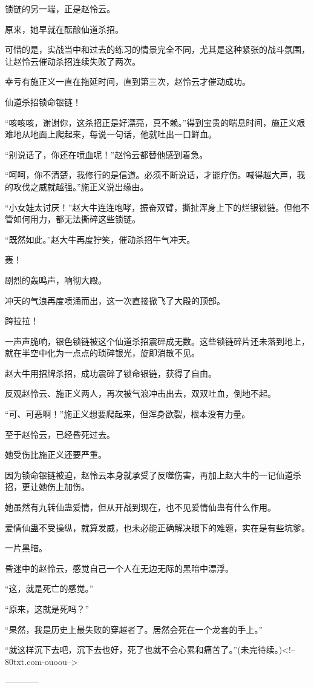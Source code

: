 \begin{this_body}
锁链的另一端，正是赵怜云。

原来，她早就在酝酿仙道杀招。

可惜的是，实战当中和过去的练习的情景完全不同，尤其是这种紧张的战斗氛围，让赵怜云催动杀招连续失败了两次。

幸亏有施正义一直在拖延时间，直到第三次，赵怜云才催动成功。

仙道杀招锁命银链！

“咳咳咳，谢谢你，这杀招正是好漂亮，真不赖。”得到宝贵的喘息时间，施正义艰难地从地面上爬起来，每说一句话，他就吐出一口鲜血。

“别说话了，你还在喷血呢！”赵怜云都替他感到着急。

“呵呵，你不清楚，我修行的是信道。必须不断说话，才能疗伤。喊得越大声，我的攻伐之威就越强。”施正义说出缘由。

“小女娃太讨厌！”赵大牛连连咆哮，振奋双臂，撕扯浑身上下的烂银锁链。但他不管如何用力，都无法撕碎这些锁链。

“既然如此。”赵大牛再度狞笑，催动杀招牛气冲天。

轰！

剧烈的轰鸣声，响彻大殿。

冲天的气浪再度喷涌而出，这一次直接掀飞了大殿的顶部。

跨拉拉！

一声声脆响，银色锁链被这个仙道杀招震碎成无数。这些锁链碎片还未落到地上，就在半空中化为一点点的琐碎银光，旋即消散不见。

赵大牛用招牌杀招，成功震碎了锁命银链，获得了自由。

反观赵怜云、施正义两人，再次被气浪冲击出去，双双吐血，倒地不起。

“可、可恶啊！”施正义想要爬起来，但浑身欲裂，根本没有力量。

至于赵怜云，已经昏死过去。

她受伤比施正义还要严重。

因为锁命银链被迫，赵怜云本身就承受了反噬伤害，再加上赵大牛的一记仙道杀招，更让她伤上加伤。

她虽然有九转仙蛊爱情，但从开战到现在，也不见爱情仙蛊有什么作用。

爱情仙蛊不受操纵，就算发威，也未必能正确解决眼下的难题，实在是有些坑爹。

一片黑暗。

昏迷中的赵怜云，感觉自己一个人在无边无际的黑暗中漂浮。

“这，就是死亡的感觉。”

“原来，这就是死吗？”

“果然，我是历史上最失败的穿越者了。居然会死在一个龙套的手上。”

“就这样沉下去吧，沉下去也好，死了也就不会心累和痛苦了。”(未完待续。)<!--80txt.com-ouoou-->

------------

\end{this_body}

